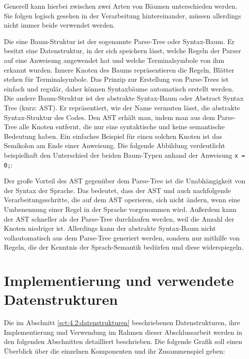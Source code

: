Generell kann hierbei zwischen zwei Arten von Bäumen unterschieden werden. Sie folgen logisch gesehen in der Verarbeitung hintereinander, müssen allerdings nicht immer beide verwendet werden.

Die eine Baum-Struktur ist der sogenannte Parse-Tree oder Syntax-Baum. Er besitzt eine Datenstruktur, in der sich speichern lässt, welche Regeln der Parser auf eine Anweisung angewendet hat und welche Terminalsymbole von ihm erkannt wurden. Innere Knoten des Baums repräsentieren die Regeln, Blätter stehen für Terminalsymbole. Das Prinzip zur Erstellung von Parse-Trees ist einfach und regulär, daher können Syntaxbäume automatisch erstellt werden.\\
Die andere Baum-Struktur ist der abstrakte Syntax-Baum oder Abstract Syntax Tree (kurz: AST). Er repräsentiert, wie der Name vermuten lässt, die abstrakte Syntax-Struktur des Codes. Den AST erhält man, indem man aus dem Parse-Tree alle Knoten entfernt, die nur eine syntaktische und keine semantische Bedeutung haben. Ein einfaches Beispiel für einen solchen Knoten ist das Semikolon am Ende einer Anweisung. Die folgende Abbildung verdeutlicht beispielhaft den Unterschied der beiden Baum-Typen anhand der Anweisung \texttt{x = 0;}:

Der große Vorteil des AST gegenüber dem Parse-Tree ist die Unabhängigkeit von der Syntax der Sprache. Das bedeutet, dass der AST und auch  nachfolgende Verarbeitungsschritte, die auf dem AST operieren, sich nicht ändern, wenn eine Umbenennung einer Regel in der Sprache vorgenommen wird. Außerdem kann der AST schneller als der Parse-Tree durchlaufen werden, weil die Anzahl der Knoten niedriger ist. Allerdings kann der abstrakte Syntax-Baum nicht vollautomatisch aus dem Parse-Tree generiert werden, sondern nur mithilfe von Regeln, die der Kenntnis der Sprach-Semantik bedürfen und diese widerspiegeln.



\section{Implementierung und verwendete Datenstrukturen}\label{ssct:4.3:implementierung}
Die im Abschnitt \ref{sct:4.2:datenstrukturen} beschriebenen Datenstrukturen, ihre Implementierung und Verwendung im Rahmen dieser Abschlussarbeit werden in den folgenden Abschnitten detailliert beschrieben. Die folgende Grafik soll einen Überblick über die einzelnen Komponenten und ihr Zusammenspiel geben:




